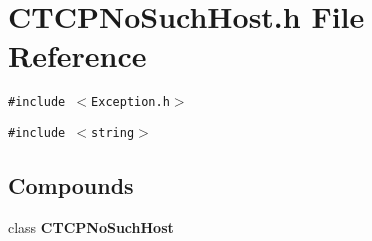 \section{CTCPNo\-Such\-Host.h File Reference}
\label{CTCPNoSuchHost_8h}
{\tt \#include $<$Exception.h$>$}\par
{\tt \#include $<$string$>$}\par
\subsection*{Compounds}
\begin{CompactItemize}
\item 
class {\bf CTCPNo\-Such\-Host}
\end{CompactItemize}
